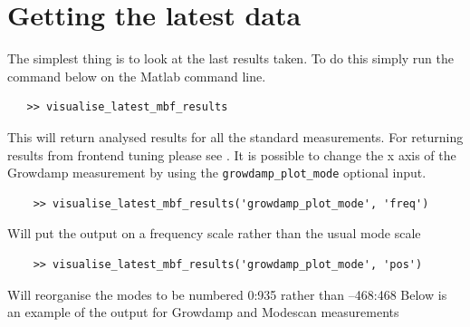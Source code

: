 \documentclass{report}
\begin{document}
\section{Getting the latest data} 

The simplest thing is to look at the last results taken. To do this simply run the command below on the Matlab command line. 
\begin{verbatim}
   >> visualise_latest_mbf_results 
\end{verbatim}
 This will return analysed results for all the standard measurements. For returning results from frontend tuning please see .
It is possible to change the x axis of the Growdamp measurement by using the  \verb+growdamp_plot_mode+ optional input.
\begin{verbatim}
    >> visualise_latest_mbf_results('growdamp_plot_mode', 'freq') 
\end{verbatim}
Will put the output on a frequency scale rather than the usual mode scale 
\begin{verbatim}
    >> visualise_latest_mbf_results('growdamp_plot_mode', 'pos') 
\end{verbatim}
Will reorganise the modes to be numbered 0:935 rather than –468:468 
Below is an example of the output for Growdamp and Modescan measurements 
\end{document}
